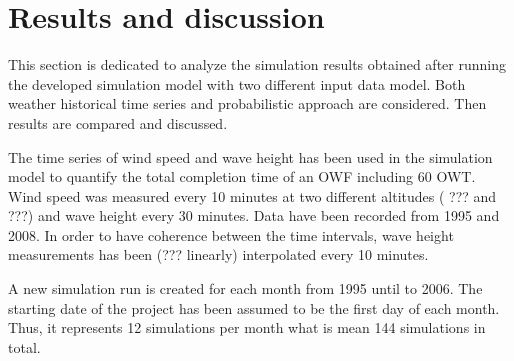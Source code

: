 \section{Results and discussion}
This section is dedicated to analyze the simulation results obtained after running the developed simulation model with two different input data model. Both weather historical time series and probabilistic approach are considered. Then results are compared and discussed.

The time series of wind speed and wave height has been used in the simulation model to quantify the total completion time of an OWF including 60 OWT. Wind speed was measured every 10 minutes at two different altitudes ( ??? and ???) and wave height every 30 minutes. Data have been recorded from 1995 and 2008. In order to have coherence between the time intervals, wave height measurements has been (??? linearly) interpolated every 10 minutes.

A new simulation run is created for each month from 1995 until to 2006. The starting date of the project has been assumed to be the first day of each month. Thus, it represents 12 simulations per month what is mean 144 simulations in total.